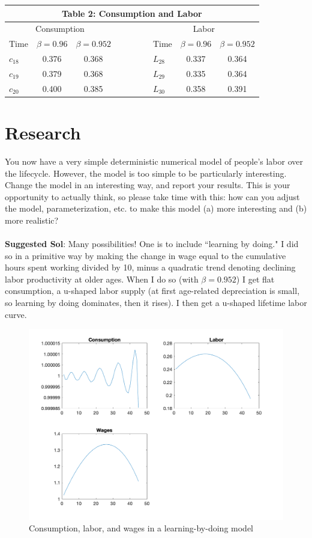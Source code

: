 \documentclass[11pt]{article}
\begin{document}
\begin{table}[ht!]
\centering
\begin{tabular}{lcclllcc}
\multicolumn{8}{c}{Table 2: Consumption  and Labor}\\
\hline\hline
\multicolumn{3}{c}{Consumption  } & & &  \multicolumn{3}{c}{Labor}\\
Time & $\beta=0.96$ & $\beta=0.952$ & \ \  & \ \ & Time & $\beta=0.96$ & $\beta=0.952$\\
\cline{1-3}  \cline{6-8}
 $c_{18}$ & 0.376 & 0.368  & & &  $L_{28}$ & 0.337  & 0.364\\
$c_{19}$ & 0.379& 0.368  & & & $L_{29}$ & 0.335 & 0.364\\
$c_{20}$ & 0.400 & 0.385  & & &  $L_{30}$ & 0.358 & 0.391\\
\hline\hline
\end{tabular}
\end{table}



\clearpage
\section{Research}
You now have a very simple deterministic numerical model of people's labor over the lifecycle.  However, the model is too simple to be particularly interesting.  Change the model in an interesting way, and report your results.  This is your opportunity to actually think, so please take time with this:  how can you adjust the model, parameterization, etc. to make this model (a) more interesting and (b) more realistic?\\
\ \\
\textbf{Suggested Sol}: Many possibilities!  One is to include ``learning by doing."  I did so in a primitive way by making the change in wage equal to the cumulative hours spent working divided by 10, minus a quadratic trend denoting declining labor productivity at older ages.  When I do so (with $\beta=0.952$) I get flat consumption, a u-shaped labor supply (at first age-related depreciation is small, so learning by doing dominates, then it rises).  I then get a u-shaped lifetime labor curve.

\begin{figure}[ht!]
\centering
\includegraphics[scale=0.5]{Figure2.png}
\caption{Consumption, labor, and wages in a learning-by-doing model}
\end{figure}
\end{document}
